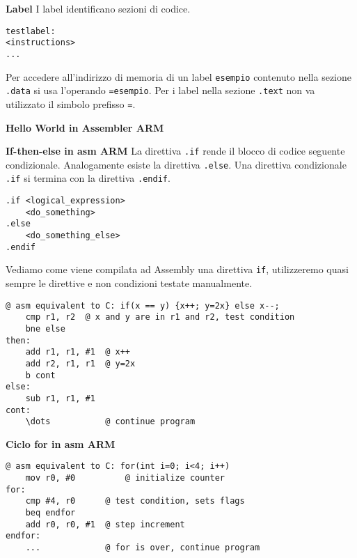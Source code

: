 \begin{defn}
\textbf{Label}
I label identificano sezioni di codice.

\begin{lstlisting}[style=arm]
testlabel:
<instructions>
...
\end{lstlisting}

Per accedere all'indirizzo di memoria di un label \texttt{esempio} contenuto nella sezione \texttt{.data} si usa l'operando \texttt{=esempio}. Per i label nella sezione \texttt{.text} non va utilizzato il simbolo prefisso \texttt{=}.
\end{defn}

\begin{exmp}
\textbf{Hello World in Assembler ARM}
\end{exmp}

\begin{defn}
\textbf{If-then-else in asm ARM}
La direttiva \texttt{.if} rende il blocco di codice seguente condizionale. Analogamente esiste la direttiva \texttt{.else}. Una direttiva condizionale \texttt{.if} si termina con la direttiva \texttt{.endif}.
\begin{lstlisting}[style=armn]
.if <logical_expression>
	<do_something>
.else
	<do_something_else>
.endif
\end{lstlisting}

Vediamo come viene compilata ad Assembly una direttiva \texttt{if}, utilizzeremo quasi sempre le direttive e non condizioni testate manualmente.
\begin{lstlisting}[style=armn]
@ asm equivalent to C: if(x == y) {x++; y=2x} else x--;
	cmp r1, r2 	@ x and y are in r1 and r2, test condition
	bne else
then:
	add r1, r1, #1 	@ x++
	add r2, r1, r1	@ y=2x
	b cont
else:
	sub r1, r1, #1
cont:
	\dots			@ continue program
\end{lstlisting}
\end{defn}

\begin{defn}
\textbf{Ciclo for in asm ARM}

\begin{lstlisting}[style=armn]
@ asm equivalent to C: for(int i=0; i<4; i++)
	mov r0, #0			@ initialize counter
for:
	cmp #4, r0		@ test condition, sets flags
	beq endfor
	add r0, r0, #1 	@ step increment
endfor:
	... 			@ for is over, continue program
\end{lstlisting}
\end{defn}

